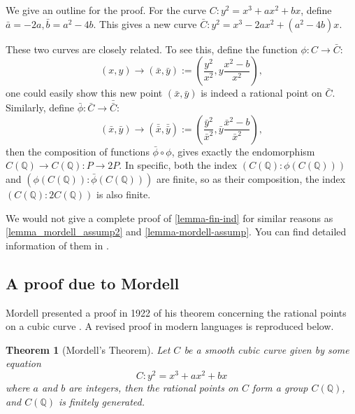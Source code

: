 \documentclass[12pt]{article}
\newtheorem{theorem}{Theorem}[subsection]
\theoremstyle{remark}
\theoremstyle{definition}
\begin{document}
        We give an outline for the proof. For the curve $C:y^2=x^3+ax^2+bx$, define $\bar{a}=-2a,\bar b=a^2-4b$.
        This gives a new curve $\bar C:y^2=x^3-2ax^2+(a^2-4b)x$.
        
        These two curves are closely related. To see this, define the function $\phi: C\rightarrow\bar C$:
        $$(x,y)\rightarrow(\bar x,\bar y):=(\frac{y^2}{x^2},y\frac{x^2-b}{x^2}),$$
        one could easily show this new point $(\bar x,\bar y)$ is indeed a rational point on $\bar C$.
        Similarly, define $\bar\phi: \bar C\rightarrow\bar{\bar C}$:
        $$(\bar x,\bar y)\rightarrow(\bar{\bar x},\bar{\bar y}):=(\frac{{\bar y}^2}{{\bar x}^2},{\bar y}\frac{{\bar x}^2-b}{{\bar x}^2}),$$
        then the composition of functions $\bar\phi\circ\phi$, gives exactly the endomorphism $C(\mathbb Q)\rightarrow C(\mathbb Q):P\rightarrow 2P.$
        In specific, both the index $(C(\mathbb Q):\phi(C(\mathbb Q)))$ and $(\phi(C(\mathbb Q)):\bar\phi(C(\mathbb Q)))$ are finite, so as their composition, the index $(C(\mathbb Q):2C(\mathbb Q))$ is also finite.
        
        We would not give a complete proof of \autoref{lemma-fin-ind} for similar reasons as \autoref{lemma_mordell_assump2} and \autoref{lemma-mordell-assump}. You can find detailed information of them in \cite{silverman_2015_rational}.
        
        
    \subsection{A proof due to Mordell}
        Mordell presented a proof in 1922 of his theorem concerning the rational points on a cubic curve \cite{mordell1}. A revised proof in modern languages is reproduced below.
        \begin{theorem}[Mordell's Theorem]
            Let $C$ be a smooth cubic curve given by some equation
            $$C:y^2 = x^3 + ax^2 + bx$$
            where $a$ and $b$ are integers, then the rational points on $C$ form a group $C(\mathbb{Q})$, and $C(\mathbb{Q})$ is finitely generated.
        \end{theorem}
    
\end{document}
